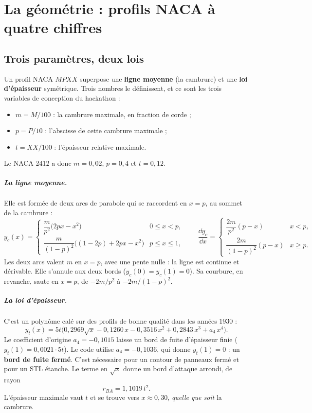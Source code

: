\chapter{La géométrie : profils NACA à quatre chiffres}\label{ch:naca}

\section{Trois paramètres, deux lois}
Un profil NACA $MPXX$ superpose une \textbf{ligne moyenne} (la cambrure) et une \textbf{loi d'épaisseur} symétrique. Trois nombres le définissent, et ce sont les trois variables de conception du hackathon :
\begin{itemize}
\item $m=M/100$ : la cambrure maximale, en fraction de corde ;
\item $p=P/10$ : l'abscisse de cette cambrure maximale ;
\item $t=XX/100$ : l'épaisseur relative maximale.
\end{itemize}
Le NACA 2412 a donc $m=0{,}02$, $p=0{,}4$ et $t=0{,}12$.

\paragraph{La ligne moyenne.} Elle est formée de deux arcs de parabole qui se raccordent en $x=p$, au sommet de la cambrure :
\[
y_c(x)=\begin{cases}\dfrac{m}{p^2}\big(2px-x^2\big) & 0\le x<p,\\[8pt]
\dfrac{m}{(1-p)^2}\big((1-2p)+2px-x^2\big) & p\le x\le1,\end{cases}
\qquad
\frac{\dd y_c}{\dd x}=\begin{cases}\dfrac{2m}{p^2}(p-x) & x<p,\\[8pt] \dfrac{2m}{(1-p)^2}(p-x) & x\ge p.\end{cases}
\]
Les deux arcs valent $m$ en $x=p$, avec une pente nulle : la ligne est continue et dérivable. Elle s'annule aux deux bords ($y_c(0)=y_c(1)=0$). Sa courbure, en revanche, saute en $x=p$, de $-2m/p^2$ à $-2m/(1-p)^2$.

\paragraph{La loi d'épaisseur.} C'est un polynôme calé sur des profils de bonne qualité dans les années 1930 :
\[
y_t(x)=5t\big(0{,}2969\sqrt x-0{,}1260\,x-0{,}3516\,x^2+0{,}2843\,x^3+a_4\,x^4\big).
\]
Le coefficient d'origine $a_4=-0{,}1015$ laisse un bord de fuite d'épaisseur finie ($y_t(1)=0{,}0021\cdot5t$). Le code utilise $a_4=-0{,}1036$, qui donne $y_t(1)=0$ : un \textbf{bord de fuite fermé}. C'est nécessaire pour un contour de panneaux fermé et pour un STL étanche. Le terme en $\sqrt x$ donne un bord d'attaque arrondi, de rayon
\[
r_{BA}=1{,}1019\,t^2 .
\]
L'épaisseur maximale vaut $t$ et se trouve vers $x\approx0{,}30$, \emph{quelle que soit} la cambrure.

